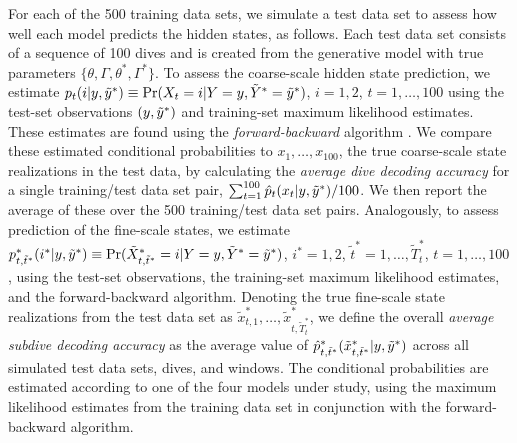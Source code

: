 For each of the 500 training data sets, we simulate a test data set to assess how well each model predicts the hidden states, as follows.
Each test data set consists of a sequence of 100 dives and is created from the generative model with true parameters $\{\theta, \Gamma, \theta^*, \Gamma^*\}$.
To assess the coarse-scale hidden state prediction, we estimate $p_t(i|y,\tilde{y}^*) \equiv \Pr(X_t=i|Y=y,\tilde{Y}^*=\tilde{y}^*)$, $i=1,2$, $t=1,\ldots,100$ using the test-set observations $(y,\tilde{y}^*)$ and training-set maximum likelihood estimates. These estimates are found using the {\em{forward-backward}} algorithm \citep{Zucchini:2016}. We compare these estimated conditional probabilities to $x_1,\ldots,x_{100}$, the true coarse-scale state realizations in the test data, by calculating the {\em{average dive decoding accuracy}} for a single training/test data set pair, $\sum_{t=1}^{100} \hat{p}_t(x_t|y,\tilde{y}^*)/100$. We then report the average of these over the 500 training/test data set pairs. 
Analogously, to assess prediction of the fine-scale states, we estimate $p^*_{t,\tilde t^*}(i^*|y,\tilde{y}^*) \equiv \Pr(\tilde X^*_{t,\tilde t^*}=i|Y=y,\tilde{Y}^*=\tilde{y}^*)$, $i^*=1,2$, $\tilde t^* = 1,\ldots,\tilde T^*_t$, $t=1,\ldots,100$, using the test-set observations, the training-set maximum likelihood estimates, and the forward-backward algorithm. Denoting the true fine-scale state realizations from the test data set as $\tilde x^*_{t,1},\ldots,\tilde x^*_{t,\tilde T^*_t}$, we define the overall \textit{average subdive decoding accuracy} as the average value of $\hat{p}^*_{t,\tilde t^*}(\tilde x^*_{t,\tilde t^*}|y,\tilde{y}^*)$ across all simulated test data sets, dives, and windows. The conditional probabilities are estimated according to one of the four models under study, using the maximum likelihood estimates from the training data set in conjunction with the forward-backward algorithm.

